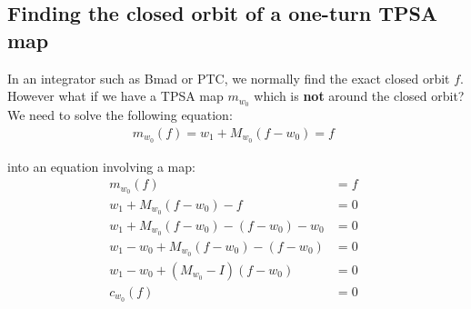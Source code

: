 \documentclass{hitec}     %
\begin{document}
{\subsection{Finding the closed orbit of  a one-turn TPSA map}\label{s:fixtpsa}

In an integrator such as Bmad or PTC, we normally find the exact closed orbit $f$. However what if we have a TPSA map ${m}_{{w}_{0}}$ which is {\bf not} around the closed orbit? We need to solve the following equation:
%
\begin{align} {m}_{{w}_{0}}\left({f}\right)={w}_{1}+{M}_{{w}_{0}}(f-{w}_{0})=f~\ \label{eq:fpeq} \end{align}

 into an equation involving a map:
%
\begin{subequations}\begin{align}  {m}_{{w}_{0}}\left({f}\right)&=f\nonumber \\
 {w}_{1}+{M}_{{w}_{0}}(f-{w}_{0})-f&=0~\label{eq:fixpeqtpsa}\\  {w}_{1}+{M}_{{w}_{0}}\left({f-{w}_{0}}\right)- \left({f-{w}_{0}}\right)-{w}_{0}&=0\nonumber \\
 {w}_{1}-{w}_{0}+{M}_{{w}_{0}}\left({f-{w}_{0}}\right)-\left({f-{w}_{0}}\right)&=0\ \nonumber \\
 {w}_{1}-{w}_{0}+\left({{M}_{{w}_{0}}-I}\right)\left({f-{w}_{0}}\right)&=0 \label{eq:cw0}\\  {c}_{{w}_{0}}\left({f}\right)&=0\ \label{eq:fmaptpsa} \  \end{align}\end{subequations}



}
\end{document}
